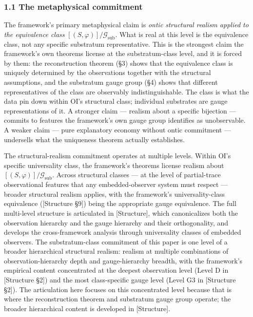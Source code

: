 \documentclass[
]{article}
\begin{document}
\hypertarget{the-metaphysical-commitment}{%
\subsubsection{1.1 The metaphysical
commitment}\label{the-metaphysical-commitment}}

The framework's primary metaphysical claim is \emph{ontic structural
realism applied to the equivalence class}
\([(S, \varphi)] / \mathcal{G}_{\text{sub}}\). What is real at this
level is the equivalence class, not any specific substratum
representative. This is the strongest claim the framework's own theorems
license at the substratum-class level, and it is forced by them: the
reconstruction theorem (§3) shows that the equivalence class is uniquely
determined by the observations together with the structural assumptions,
and the substratum gauge group (§4) shows that different representatives
of the class are observably indistinguishable. The class is what the
data pin down within OI's structural class; individual substrates are
gauge representations of it. A stronger claim --- realism about a
specific bijection --- commits to features the framework's own gauge
group identifies as unobservable. A weaker claim --- pure explanatory
economy without ontic commitment --- undersells what the uniqueness
theorem actually establishes.

The structural-realism commitment operates at multiple levels. Within
OI's specific universality class, the framework's theorems license
realism about \([(S, \varphi)] / \mathcal{G}_{\text{sub}}\). Across
structural classes --- at the level of partial-trace observational
features that any embedded-observer system must respect --- broader
structural realism applies, with the framework's universality-class
equivalence ({[}Structure §9{]}) being the appropriate gauge
equivalence. The full multi-level structure is articulated in
{[}Structure{]}, which canonicalizes both the observation hierarchy and
the gauge hierarchy and their orthogonality, and develops the
cross-framework analysis through universality classes of embedded
observers. The substratum-class commitment of this paper is one level of
a broader hierarchical structural realism: realism at multiple
combinations of observation-hierarchy depth and gauge-hierarchy breadth,
with the framework's empirical content concentrated at the deepest
observation level (Level D in {[}Structure §2{]}) and the most
class-specific gauge level (Level G3 in {[}Structure §2{]}). The
articulation here focuses on this concentrated level because that is
where the reconstruction theorem and substratum gauge group operate; the
broader hierarchical content is developed in {[}Structure{]}.
\end{document}

